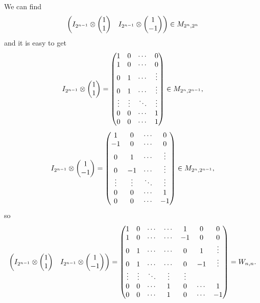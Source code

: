 \documentclass[12pt]{article}
\begin{document}
We can find \[
\begin{pmatrix}
I_{2^{n-1}} \otimes 
\begin{pmatrix}
1 \\
1
\end{pmatrix}
& 
I_{2^{n-1}} \otimes 
\begin{pmatrix}
1 \\
-1
\end{pmatrix}
\end{pmatrix} \in M_{2^n,2^n}
\] 
and it is easy to get 
\[
I_{2^{n-1}} \otimes 
\begin{pmatrix}
1 \\
1
\end{pmatrix}
=
\begin{pmatrix}
1 & 0 & \cdots & 0 \\
1 & 0 & \cdots & 0 \\
0 & 1 & \cdots & \vdots \\
0 & 1 & \cdots & \vdots \\
\vdots  & \vdots & \ddots & \vdots \\
0 & 0 & \cdots &1 \\
0 & 0 & \cdots &1 \\
\end{pmatrix} 
\in M_{2^n, 2^{n-1}},
\]
\[
I_{2^{n-1}} \otimes 
\begin{pmatrix}
1 \\
-1
\end{pmatrix}
=
\begin{pmatrix}
1 & 0 & \cdots & 0 \\
-1 & 0 & \cdots & 0 \\
0 & 1 & \cdots & \vdots \\
0 & -1 & \cdots & \vdots \\
\vdots  & \vdots & \ddots & \vdots \\
0 & 0 & \cdots &1 \\
0 & 0 & \cdots &-1 \\
\end{pmatrix} 
\in M_{2^n, 2^{n-1}},
\]
so 
\[
\begin{pmatrix}
I_{2^{n-1}} \otimes 
\begin{pmatrix}
1 \\
1
\end{pmatrix}
&
I_{2^{n-1}} \otimes 
\begin{pmatrix}
1 \\
-1
\end{pmatrix}
\end{pmatrix}
=
\begin{pmatrix}
1 & 0 & \cdots & \cdots  & 1  & 0 & 0 \\
1 & 0 & \cdots & \cdots  & -1 & 0 & 0 \\
0 & 1 & \cdots & \cdots  & 0  & 1 & \vdots \\
0 & 1 & \cdots & \cdots  & 0  & -1 & \vdots \\
\vdots  & \vdots & \ddots & \vdots & \vdots \\
0 & 0 & \cdots &1 &0  & \cdots & 1 \\
0 & 0 & \cdots &1 &0  & \cdots & -1 
\end{pmatrix} 
= W_{n,n}.
\]
\end{document}
